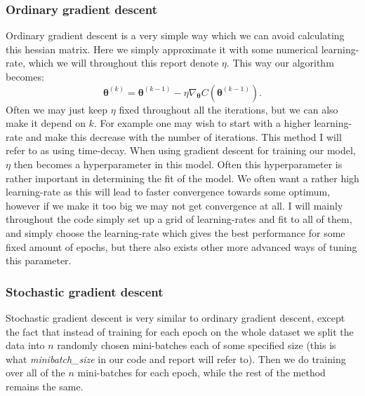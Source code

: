 \documentclass{article}
\begin{document}
\subsubsection{Ordinary gradient descent}
Ordinary gradient descent is a very simple way which we can avoid calculating
this hessian matrix. Here we simply approximate it with some numerical
learning-rate, which we will throughout this report denote $\eta$. This way our
algorithm becomes:
$$\bm{\theta}^{(k)} = \bm{\theta}^{(k-1)} - \eta \nabla_{\bm{\theta}} C(\bm{\theta}^{(k-1)}).$$
Often we may just keep $\eta$  fixed throughout all the iterations, but we can
also make it depend on $k$. For example one may wish to start with a higher
learning-rate and make this decrease with the number of iterations. This method
I will refer to as using time-decay.  When using gradient descent for training
our model, $\eta$ then becomes a hyperparameter in this model. Often this
hyperparameter is rather important in determining the fit of the model. We often
want a rather high learning-rate as this will lead to faster convergence towards
some optimum, however if we make it too big we may not get convergence at all. I
will mainly throughout the code simply set up a grid of learning-rates and fit
to all of them, and simply choose the learning-rate which gives the best
performance for some fixed amount of epochs, but there also exists other more
advanced ways of tuning this parameter.

\subsubsection{Stochastic gradient descent}
Stochastic gradient descent is very similar to ordinary gradient descent, except
the fact that instead of training for each epoch on the whole dataset we split
the data into $n$ randomly chosen mini-batches each of some specified size (this
is what \textit{minibatch\_size} in our code and report will refer to). Then we
do training over all of the $n$ mini-batches for each epoch, while the rest of
the method remains the same.
\end{document}
